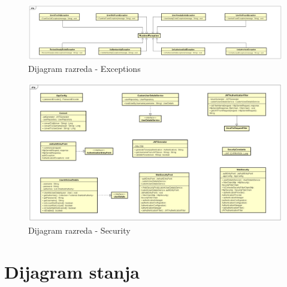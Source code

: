 			\begin{figure}[H]
				\includegraphics[width=\textwidth]{dijagrami/cd6.png} 
				\centering
				\vspace{-0.5cm}
				\caption{Dijagram razreda - Exceptions}
				\label{cd6}
			\end{figure}

			\eject
		
			\begin{figure}[H]
				\includegraphics[width=\textwidth]{dijagrami/cd7.png} 
				\centering
				\caption{Dijagram razreda - Security}
				\label{cd7}
			\end{figure}
			
			\eject
		\section{Dijagram stanja}
			

